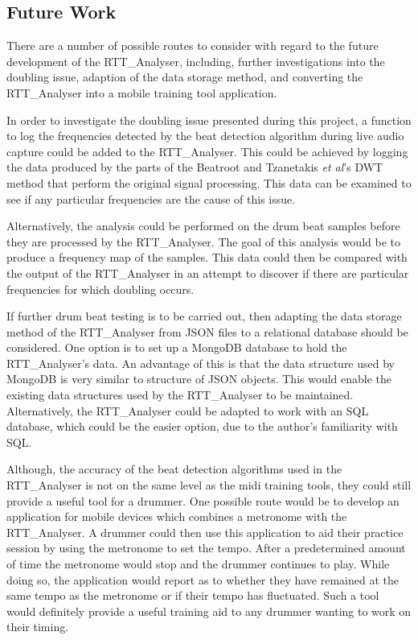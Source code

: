 \documentclass[a4paper, 11pt]{article}
\begin{document}
\subsection{Future Work}
There are a number of possible routes to consider with regard to the future development of the RTT\_Analyser, including, further investigations into the doubling issue, adaption of the data storage method, and converting the RTT\_Analyser into a mobile training tool application.\par

In order to investigate the doubling issue presented during this project, a function to log the frequencies detected by the beat detection algorithm during live audio capture could be added to the RTT\_Analyser. This could be achieved by logging the data produced by the parts of the Beatroot and Tzanetakis \textit{et al}'s \cite{tzane1} DWT method that perform the original signal processing. This data can be examined to see if any particular frequencies are the cause of this issue.\par

Alternatively, the analysis could be performed on the drum beat samples before they are processed by the RTT\_Analyser. The goal of this analysis would be to produce a frequency map of the samples. This data could then be compared with the output of the RTT\_Analyser in an attempt to discover if there are particular frequencies for which doubling occurs.\par

If further drum beat testing is to be carried out, then adapting the data storage method of the RTT\_Analyser from JSON files to a relational database should be considered. One option is to set up a MongoDB\cite{mongo} database to hold the RTT\_Analyser's data. An advantage of this is that the data structure used by MongoDB is very similar to structure of JSON objects. This would enable the existing data structures used by the RTT\_Analyser to be maintained. Alternatively, the RTT\_Analyser could be adapted to work with an SQL database, which could be the easier option, due to the author's familiarity with SQL.\par  

Although, the accuracy of the beat detection algorithms used in the RTT\_Analyser is not on the same level as the midi training tools, they could still provide a useful tool for a drummer. One possible route would be to develop an application for mobile devices which combines a metronome with the RTT\_Analyser. A drummer could then use this application to aid their practice session by using the metronome to set the tempo. After a predetermined amount of time the metronome would stop and the drummer continues to play. While doing so, the application would report as to whether they have remained at the same tempo as the metronome or if their tempo has fluctuated. Such a tool would definitely provide a useful training aid to any drummer wanting to work on their timing.
\end{document}
